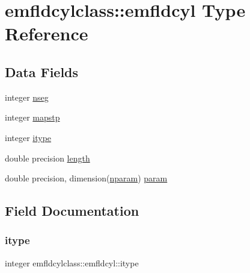 \hypertarget{structemfldcylclass_1_1emfldcyl}{}\section{emfldcylclass\+::emfldcyl Type Reference}
\label{structemfldcylclass_1_1emfldcyl}
\subsection*{Data Fields}
\begin{DoxyCompactItemize}
\item 
integer \mbox{\hyperlink{structemfldcylclass_1_1emfldcyl_a0e3fc4ea59fb87362a87c87bd7381c99}{nseg}}
\item 
integer \mbox{\hyperlink{structemfldcylclass_1_1emfldcyl_ae91a238805ec7c8877fe7678af96d14f}{mapstp}}
\item 
integer \mbox{\hyperlink{structemfldcylclass_1_1emfldcyl_a3ba2c596d30c652482c75aa404dfbf85}{itype}}
\item 
double precision \mbox{\hyperlink{structemfldcylclass_1_1emfldcyl_a7db15b53a24d51010742b079320eaf82}{length}}
\item 
double precision, dimension(\mbox{\hyperlink{namespaceemfldcylclass_a4b336ecf0cd4052beb8ac386391e19e9}{nparam}}) \mbox{\hyperlink{structemfldcylclass_1_1emfldcyl_aae12b122be9447025032a7afbb39d0ff}{param}}
\end{DoxyCompactItemize}


\subsection{Field Documentation}
\mbox{\label{structemfldcylclass_1_1emfldcyl_a3ba2c596d30c652482c75aa404dfbf85}} 
\subsubsection{\texorpdfstring{itype}{itype}}
{\footnotesize\ttfamily integer emfldcylclass\+::emfldcyl\+::itype}

\mbox{\label{structemfldcylclass_1_1emfldcyl_a7db15b53a24d51010742b079320eaf82}} 
